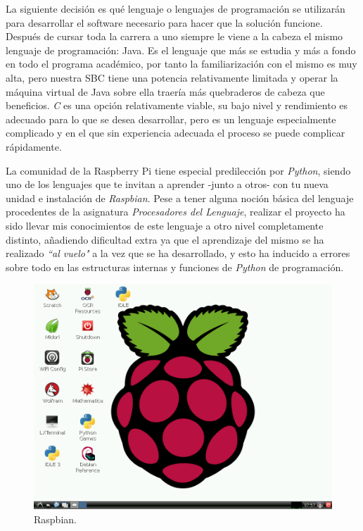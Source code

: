 	La siguiente decisión es qué lenguaje o lenguajes de programación se utilizarán para desarrollar el software necesario para hacer que la solución funcione. Después de cursar toda la carrera a uno siempre le viene a la cabeza el mismo lenguaje de programación: Java. Es el lenguaje que más se estudia y más a fondo en todo el programa académico, por tanto la familiarización con el mismo es muy alta, pero nuestra SBC tiene una potencia relativamente limitada y operar la máquina virtual de Java sobre ella traería más quebraderos de cabeza que beneficios. \emph{C} es una opción relativamente viable, su bajo nivel y rendimiento es adecuado para lo que se desea desarrollar, pero es un lenguaje especialmente complicado y en el que sin experiencia adecuada el proceso se puede complicar rápidamente.
	
	La comunidad de la Raspberry Pi tiene especial predilección por \emph{Python}, siendo uno de los lenguajes que te invitan a aprender -junto a otros- con tu nueva unidad e instalación de \emph{Raspbian}. Pese a tener alguna noción básica del lenguaje procedentes de la asignatura \emph{Procesadores del Lenguaje}, realizar el proyecto ha sido llevar mis conocimientos de este lenguaje a otro nivel completamente distinto, añadiendo dificultad extra ya que el aprendizaje del  mismo se ha realizado \emph{``al vuelo"} a la vez que se ha desarrollado, y esto ha inducido a errores sobre todo en las estructuras internas y funciones de \emph{Python} de programación.

\begin{figure}[hb]
  \centering
  \includegraphics[width=1\textwidth]{img/2014-08-22-075744_976x736_scrot.png}
  \caption[Escritorio de Raspbian.]{Raspbian.}
  \label{fig:raspbian-desktop}
\end{figure}